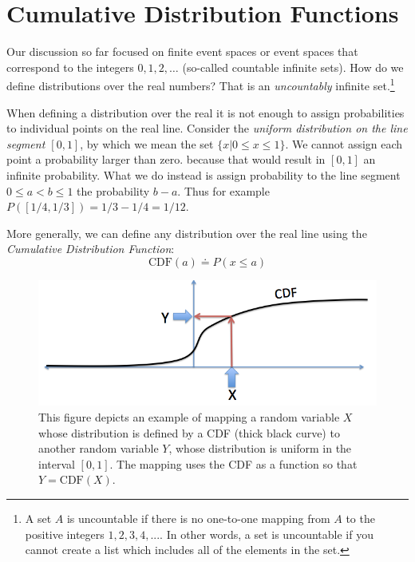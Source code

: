 \documentclass{report}
\theoremstyle{plain}
\theoremstyle{definition}
\begin{document}
\scribe{}

\maketitle

\section{Cumulative Distribution Functions}

Our discussion so far focused on finite event spaces or event spaces
that correspond to the integers $0,1,2,\ldots$ (so-called countable
infinite sets). How do we define distributions over the real numbers?
That is an {\em uncountably} infinite set.\footnote{A set $A$ is
  uncountable if there is no one-to-one mapping from $A$ to the
  positive integers $1,2,3,4,...$. In other words, a set is
  uncountable if you cannot create a list which includes all of the
  elements in the set.}

When defining a distribution over the real it is not enough to assign
probabilities to individual points on the real line. Consider the {\em
  uniform distribution on the line segment $[0,1]$}, by which
we mean the set $\{x | 0 \leq x \leq 1\}$. We cannot assign each
point a probability larger than zero. because that would result in
$[0,1]$ an infinite probability. What we do instead is assign
probability to the line segment $0 \leq a < b \leq 1$ the probability
$b-a$. Thus for example $P([1/4,1/3])=1/3-1/4 = 1/12$.

More generally, we can define any distribution over the real line
using the {\em Cumulative Distribution Function}:
\newcommand{\CDF}{\mbox{CDF}}
\[
\CDF(a) \doteq P(x \leq a)
\]

\begin{figure}[th]
\begin{center}
\includegraphics[width=5in]{figs/CDFmapping.png}
\end{center}
\caption{This figure depicts an example of mapping a random variable
  $X$ whose distribution is defined by a CDF (thick black curve) to
  another random variable $Y$, whose distribution is uniform in the
  interval $[0,1]$. The mapping uses the CDF as a function so that
  $Y=\CDF(X)$. \label{fig:CDFmap}}
\end{figure}
\end{document}

